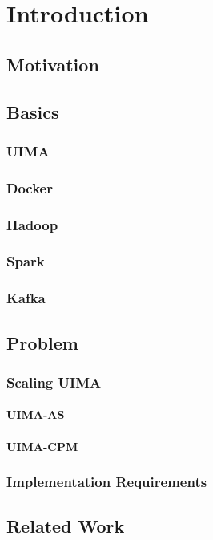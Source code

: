 \chapter{Introduction}

\section{Motivation}

\section{Basics}

\subsection{UIMA}
\subsection{Docker}
\subsection{Hadoop}
\subsection{Spark}
\subsection{Kafka}

\section{Problem}
\subsection{Scaling UIMA}
\subsubsection{UIMA-AS}
\subsubsection{UIMA-CPM}
\subsection{Implementation Requirements}


\section{Related Work}

